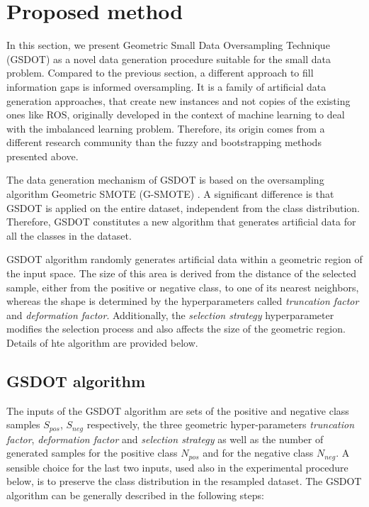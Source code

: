 \section{Proposed method}
\label{proposed}

In this section, we present Geometric Small Data Oversampling Technique (GSDOT) as a novel data generation procedure suitable for the small data problem. Compared to the previous section, a different approach to fill information gaps is informed oversampling. It is a family of artificial data generation approaches, that create new instances and not copies of the existing ones like ROS, originally developed in the context of machine learning to deal with the imbalanced learning problem. Therefore, its origin comes from a different research community than the fuzzy and bootstrapping methods presented above.

The data generation mechanism of GSDOT is based on the oversampling algorithm Geometric SMOTE (G-SMOTE) \cite{Douzas.2019}. A significant difference is that GSDOT is applied on the entire dataset, independent from the class distribution. Therefore, GSDOT constitutes a new algorithm that generates artificial data for all the classes in the dataset.

GSDOT algorithm randomly generates artificial data within a geometric region of the input space. The size of this area is derived from the distance of the selected sample, either from the positive or negative class, to one of its nearest neighbors, whereas the shape is determined by the hyperparameters called \textit{truncation factor} and \textit{deformation factor}. Additionally, the \textit{selection strategy} hyperparameter modifies the selection process and also affects the size of the geometric region. Details of hte algorithm are provided below.

\subsection{GSDOT algorithm}
\label{algorithm}

The inputs of the GSDOT algorithm are sets of the positive and negative class samples \( S_{pos} \), \( S_{neg} \) respectively, the three geometric hyper-parameters \textit{truncation factor}, \textit{deformation factor} and \textit{selection strategy} as well as the number of generated samples for the positive class \(N_{pos} \) and for the negative class \( N_{neg} \). A sensible choice for the last two inputs, used also in the experimental procedure below, is to preserve the class distribution in the resampled dataset. The GSDOT algorithm can be generally described in the following steps:

